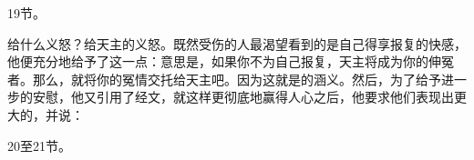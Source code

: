 19节。\par

给什么义怒？给天主的义怒。既然受伤的人最渴望看到的是自己得享报复的快感，他便充分地给予了这一点：意思是，如果你不为自己报复，天主将成为你的伸冤者。那么，就将你的冤情交托给天主吧。因为这就是的涵义。然后，为了给予进一步的安慰，他又引用了经文，就这样更彻底地赢得人心之后，他要求他们表现出更大的，并说：\par

20至21节。\par

